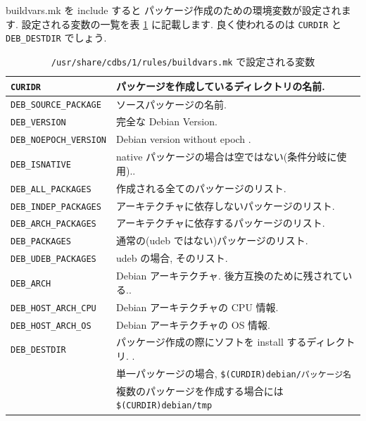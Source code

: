 \documentclass[mingoth,a4paper]{jsarticle}
\begin{document}
buildvars.mk を include すると
パッケージ作成のための環境変数が設定されます.
%
設定される変数の一覧を表 \ref{table:buildvars.mk} に記載します.
%
良く使われるのは {\tt CURDIR} と {\tt DEB\_DESTDIR} でしょう.
%
\begin{table}[htbp!]
    \begin{center}
        \caption{{\tt /usr/share/cdbs/1/rules/buildvars.mk} で設定される変数}
        \label{table:buildvars.mk}
        {\small 
        \begin{tabular}[tb]{|l|l|}
            \hline
            {\tt CURIDR} & 
            パッケージを作成しているディレクトリの名前.\\
            \hline
            {\tt DEB\_SOURCE\_PACKAGE} & 
                ソースパッケージの名前.\\
            \hline
            {\tt DEB\_VERSION} & 
                完全な Debian Version.\\
            \hline
            {\tt DEB\_NOEPOCH\_VERSION} & 
                Debian version without epoch .\\
            \hline
            {\tt DEB\_ISNATIVE} & 
                native パッケージの場合は空ではない(条件分岐に使用)..\\
            \hline
            {\tt DEB\_ALL\_PACKAGES} & 
                作成される全てのパッケージのリスト.\\
            \hline
            {\tt DEB\_INDEP\_PACKAGES} & 
                アーキテクチャに依存しないパッケージのリスト.\\
            \hline
            {\tt DEB\_ARCH\_PACKAGES} & 
                アーキテクチャに依存するパッケージのリスト.\\
            \hline
            {\tt DEB\_PACKAGES} & 
                通常の(udeb ではない)パッケージのリスト.\\
            \hline
            {\tt DEB\_UDEB\_PACKAGES} & 
                udeb の場合, そのリスト.\\
            \hline
            {\tt DEB\_ARCH} & 
                Debian アーキテクチャ. 後方互換のために残されている..\\
            \hline
            {\tt DEB\_HOST\_ARCH\_CPU} & 
                Debian アーキテクチャの CPU 情報.\\
            \hline
            {\tt DEB\_HOST\_ARCH\_OS} & 
                Debian アーキテクチャの OS 情報.\\
            \hline
            {\tt DEB\_DESTDIR} & 
                パッケージ作成の際にソフトを install するディレクトリ. .\\
            & 単一パッケージの場合, {\tt \$(CURDIR)debian/パッケージ名} \\
            & 複数のパッケージを作成する場合には {\tt \$(CURDIR)debian/tmp}\\
            \hline
        \end{tabular}
        }
    \end{center}
\end{table}
\end{document}
